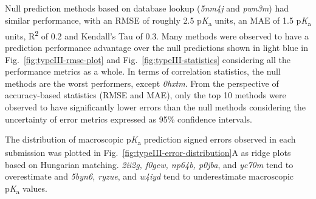 \documentclass[9pt,lineno,final]{elife}
\newcommand{\pKa}{p\textit{K}\textsubscript{a}}
\begin{document}
Null prediction methods based on database lookup (\textit{5nm4j} and \textit{pwn3m}) had similar performance, with an RMSE of roughly 2.5 \pKa{} units, an MAE of 1.5 \pKa{} units, R\textsuperscript{2} of 0.2 and Kendall's Tau of 0.3.
Many methods were observed to have a prediction performance advantage over the null predictions shown in light blue in Fig.~\ref{fig:typeIII-rmse-plot} and Fig.~\ref{fig:typeIII-statistics} considering all the performance metrics as a whole.
In terms of correlation statistics, the null methods are the worst performers, except \textit{0hxtm}.
From the perspective of accuracy-based statistics (RMSE and MAE), only the top 10 methods were observed to have significantly lower errors than the null methods considering the uncertainty of error metrics expressed as 95\% confidence intervals.

The distribution of macroscopic \pKa{} prediction signed errors observed in each submission was plotted in Fig.~\ref{fig:typeIII-error-distribution}A as ridge plots based on Hungarian matching.
\textit{2ii2g, f0gew, np64b, p0jba}, and \textit{yc70m} tend to overestimate and \textit{
5byn6, ryzue}, and \textit{w4iyd} tend to underestimate macroscopic \pKa{} values. 
\end{document}
